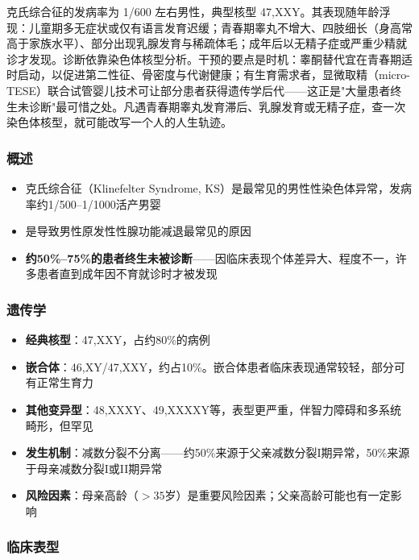 克氏综合征的发病率为 1/600 左右男性，典型核型 47,XXY。其表现随年龄浮现：儿童期多无症状或仅有语言发育迟缓；青春期睾丸不增大、四肢细长（身高常高于家族水平）、部分出现乳腺发育与稀疏体毛；成年后以无精子症或严重少精就诊才发现。诊断依靠染色体核型分析。干预的要点是时机：睾酮替代宜在青春期适时启动，以促进第二性征、骨密度与代谢健康；有生育需求者，显微取精（micro-TESE）联合试管婴儿技术可让部分患者获得遗传学后代——这正是"大量患者终生未诊断"最可惜之处。凡遇青春期睾丸发育滞后、乳腺发育或无精子症，查一次染色体核型，就可能改写一个人的人生轨迹。

\subsubsection{概述}

\begin{itemize}[leftmargin=2cm]
	\item 克氏综合征（Klinefelter Syndrome, KS）是最常见的男性性染色体异常，发病率约1/500--1/1000活产男婴
	\item 是导致男性原发性性腺功能减退最常见的原因
	\item \textbf{约50\%--75\%的患者终生未被诊断}——因临床表现个体差异大、程度不一，许多患者直到成年因不育就诊时才被发现
\end{itemize}

\subsubsection{遗传学}

\begin{itemize}[leftmargin=2cm]
	\item \textbf{经典核型}：47,XXY，占约80\%的病例
	\item \textbf{嵌合体}：46,XY/47,XXY，约占10\%。嵌合体患者临床表现通常较轻，部分可有正常生育力
	\item \textbf{其他变异型}：48,XXXY、49,XXXXY等，表型更严重，伴智力障碍和多系统畸形，但罕见
	\item \textbf{发生机制}：减数分裂不分离——约50\%来源于父亲减数分裂I期异常，50\%来源于母亲减数分裂I或II期异常
	\item \textbf{风险因素}：母亲高龄（$>35$岁）是重要风险因素；父亲高龄可能也有一定影响
\end{itemize}

\subsubsection{临床表型}

